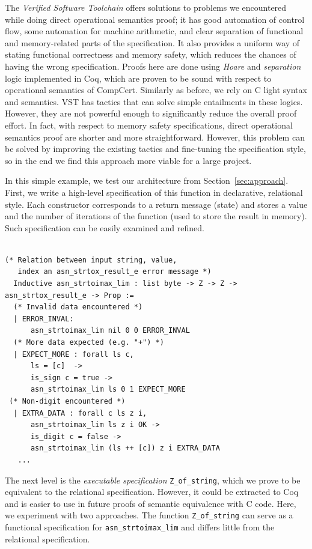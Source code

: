 \documentclass[10p,conference]{IEEEtran}
\begin{document}
The \textit{Verified Software Toolchain} \cite{VST} offers solutions
to problems we encountered while doing direct operational semantics
proof; it has good automation of control flow, some automation for
machine arithmetic, and clear separation of functional and
memory-related parts of the specification. It also provides a uniform
way of stating functional correctness and memory safety, which reduces
the chances of having the wrong specification. Proofs here are done
using \textit{Hoare} and \textit{separation} logic implemented in Coq,
which are proven to be sound with respect to operational semantics of
CompCert. Similarly as before, we rely on C light syntax and
semantics. VST has tactics that can solve simple entailments in these
logics. However, they are not powerful enough to significantly reduce
the overall proof effort. In fact, with respect to memory safety
specifications, direct operational semantics proof are shorter and
more straightforward. However, this problem can be solved by improving
the existing tactics and fine-tuning the specification style, so in
the end we find this approach more viable for a large project.

In this simple example, we test our architecture from
Section~\ref{sec:approach}. First, we write a high-level specification
of this function in declarative, relational style. Each constructor
corresponds to a return message (state) and stores a value and the
number of iterations of the function (used to store the result in
memory). Such specification can be easily examined and refined.

 \begin{lstlisting}[language=Coq]

(* Relation between input string, value, 
   index an asn_strtox_result_e error message *)
  Inductive asn_strtoimax_lim : list byte -> Z -> Z -> asn_strtox_result_e -> Prop :=
  (* Invalid data encountered *)
  | ERROR_INVAL:
      asn_strtoimax_lim nil 0 0 ERROR_INVAL
  (* More data expected (e.g. "+") *)
  | EXPECT_MORE : forall ls c,
      ls = [c]  ->
      is_sign c = true ->
      asn_strtoimax_lim ls 0 1 EXPECT_MORE
 (* Non-digit encountered *)
  | EXTRA_DATA : forall c ls z i,
      asn_strtoimax_lim ls z i OK ->
      is_digit c = false -> 
      asn_strtoimax_lim (ls ++ [c]) z i EXTRA_DATA
   ...    
  \end{lstlisting}

  The next level is the \textit{executable specification}
  \texttt{Z\_of\_string}, which we prove to be equivalent to the
  relational specification. However, it could be extracted to Coq and
  is easier to use in future proofs of semantic equivalence with C
  code. Here, we experiment with two approaches. The function 
   \texttt{Z\_of\_string} can serve as a functional specification for
  \texttt{asn\_strtoimax\_lim} and differs little from the
  relational specification. 
\end{document}
